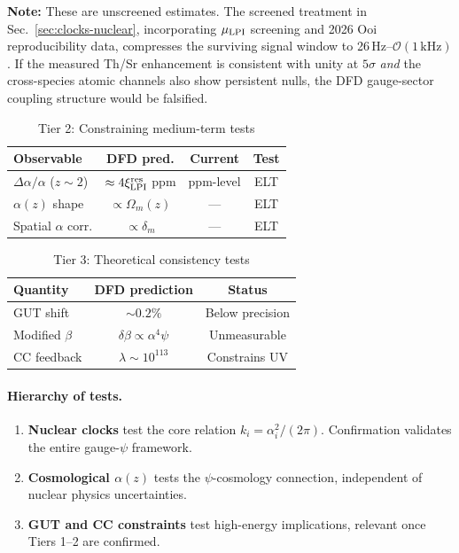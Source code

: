 \textbf{Note:} These are unscreened estimates.  The screened treatment in Sec.~\ref{sec:clocks-nuclear}, incorporating $\mu_{\rm LPI}$ screening and 2026 Ooi reproducibility data, compresses the surviving signal window to 26\,Hz--$\mathcal{O}(1\,\mathrm{kHz})$.  If the measured Th/Sr enhancement is consistent with unity at $5\sigma$ \emph{and} the cross-species atomic channels also show persistent nulls, the DFD gauge-sector coupling structure would be falsified.

\begin{table}[h]
\centering
\caption{Tier 2: Constraining medium-term tests}\label{tab:tier2-predictions}
\begin{ruledtabular}
\scriptsize
\begin{tabular}{lccc}
\textbf{Observable} & \textbf{DFD pred.} & \textbf{Current} & \textbf{Test} \\
\hline
$\Delta\alpha/\alpha$ ($z\sim 2$) & $\approx 4\xi_{\rm LPI}^{\rm res}$ ppm & ppm-level & ELT \\
$\alpha(z)$ shape & $\propto \Omega_m(z)$ & --- & ELT \\
Spatial $\alpha$ corr. & $\propto \delta_m$ & --- & ELT \\
\end{tabular}
\end{ruledtabular}
\end{table}

\begin{table}[h]
\centering
\caption{Tier 3: Theoretical consistency tests}\label{tab:tier3-predictions}
\renewcommand{\arraystretch}{1.2}
\small
\begin{tabular}{@{}lcc@{}}
\toprule
Quantity & DFD prediction & Status \\
\midrule
GUT shift & $\sim 0.2\%$ & Below precision \\
Modified $\beta$ & $\delta\beta \propto \alpha^4\psi$ & Unmeasurable \\
CC feedback & $\lambda \sim 10^{113}$ & Constrains UV \\
\bottomrule
\end{tabular}
\end{table}

\paragraph{Hierarchy of tests.}
\begin{enumerate}
\item \textbf{Nuclear clocks} test the core relation $k_i = \alpha_i^2/(2\pi)$. Confirmation validates the entire gauge-$\psi$ framework.
\item \textbf{Cosmological $\alpha(z)$} tests the $\psi$-cosmology connection, independent of nuclear physics uncertainties.
\item \textbf{GUT and CC constraints} test high-energy implications, relevant once Tiers 1--2 are confirmed.
\end{enumerate}

